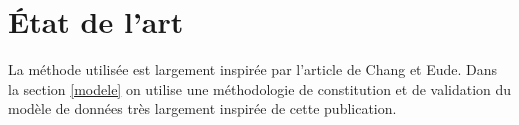 \section{État de l'art}



La méthode utilisée est largement inspirée par l'article de Chang et Eude\cite{doi:10.1111/coin.12122}.
Dans la section \ref{modele} on utilise une méthodologie de constitution et de validation du modèle de données très largement inspirée de cette publication.

